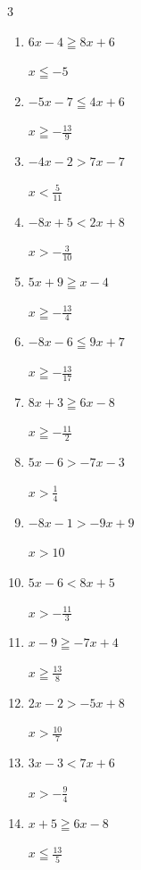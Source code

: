 \begin{multicols}{3}
\begin{enumerate}
  \item $6x-4\geqq 8x+6$

        $\displaystyle x\leqq -5$

  \item $-5x-7\leqq 4x+6$

        $\displaystyle x\geqq -\frac{13}{9}$

  \item $-4x-2>7x-7$

        $\displaystyle x<\frac{5}{11}$

\columnbreak %

  \item $-8x+5<2x+8$

        $\displaystyle x>-\frac{3}{10}$

  \item $5x+9\geqq x-4$

        $\displaystyle x\geqq -\frac{13}{4}$

  \item $-8x-6\leqq 9x+7$

        $\displaystyle x\geqq -\frac{13}{17}$

  \item $8x+3\geqq 6x-8$

        $\displaystyle x\geqq -\frac{11}{2}$

  \item $5x-6>-7x-3$

        $\displaystyle x>\frac{1}{4}$

  \item $-8x-1>-9x+9$

        $\displaystyle x>10$

  \item $5x-6<8x+5$

        $\displaystyle x>-\frac{11}{3}$

  \item $x-9\geqq -7x+4$

        $\displaystyle x\geqq \frac{13}{8}$

  \item $2x-2>-5x+8$

        $\displaystyle x>\frac{10}{7}$

  \item $3x-3<7x+6$

        $\displaystyle x>-\frac{9}{4}$

  \item $x+5\geqq 6x-8$

        $\displaystyle x\leqq \frac{13}{5}$


\end{enumerate}
\end{multicols}
